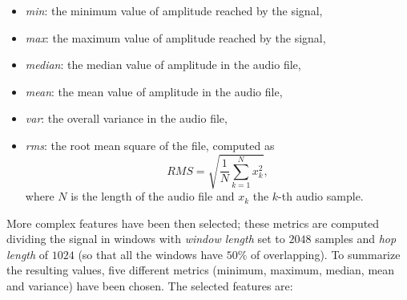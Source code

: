 \documentclass[oneside,openany]{article}
\begin{document}
    \begin{itemize}
    \item \textit{min}: the minimum value of amplitude reached by the signal,
    \item \textit{max}: the maximum value of amplitude reached by the signal,
    \item \textit{median}: the median value of amplitude in the audio file,
    \item \textit{mean}: the mean value of amplitude in the audio file,
    \item \textit{var}: the overall variance in the audio file,
    \item \textit{rms}: the root mean square of the file, computed as \[RMS=\sqrt{\frac{1}{N}\sum_{k=1}^N x_k^2},\] where $N$ is the length of the audio file and $x_k$ the $k$-th audio sample.
    \end{itemize}
    More complex features have been then selected; these metrics are computed dividing the signal in windows with \textit{window length} set to $2048$ samples and \textit{hop length} of $1024$ (so that all the windows have $50\%$ of overlapping). To summarize the resulting values, five different metrics (minimum, maximum, median, mean and variance) have been chosen. 
    The selected features are:
\end{document}

